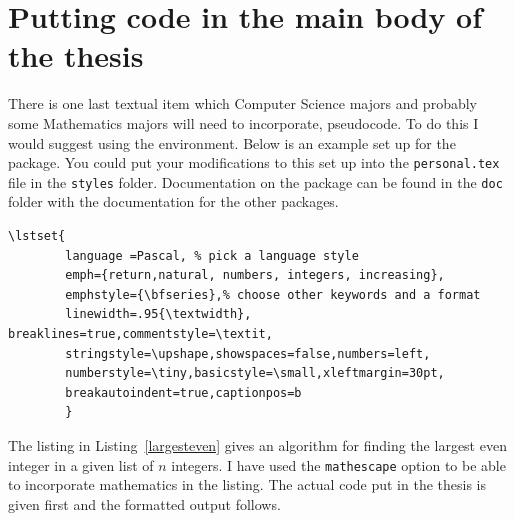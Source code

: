 \section{Putting code in the main body of the thesis}
There is one last textual item which Computer Science majors and probably some Mathematics majors will need to incorporate, pseudocode. To do this I would suggest using the  environment. Below is an example set up for the  package. You could put your modifications to this set up into the \texttt{personal.tex} file in the \texttt{styles} folder. Documentation on the  package can be found in the \texttt{doc} folder with the documentation for the other packages.
{\small\begin{singlespace}
\begin{verbatim}
\lstset{
        language =Pascal, % pick a language style
        emph={return,natural, numbers, integers, increasing},
        emphstyle={\bfseries},% choose other keywords and a format
        linewidth=.95{\textwidth}, breaklines=true,commentstyle=\textit,
        stringstyle=\upshape,showspaces=false,numbers=left,
        numberstyle=\tiny,basicstyle=\small,xleftmargin=30pt,
        breakautoindent=true,captionpos=b
        }
\end{verbatim}
\end{singlespace}}

The listing in Listing~\ref{largesteven} gives an algorithm for finding the largest even integer in a given list of $n$ integers. I have used the \texttt{mathescape} option to be able to incorporate mathematics in the listing. The actual code put in the thesis is given first and the formatted output follows.

